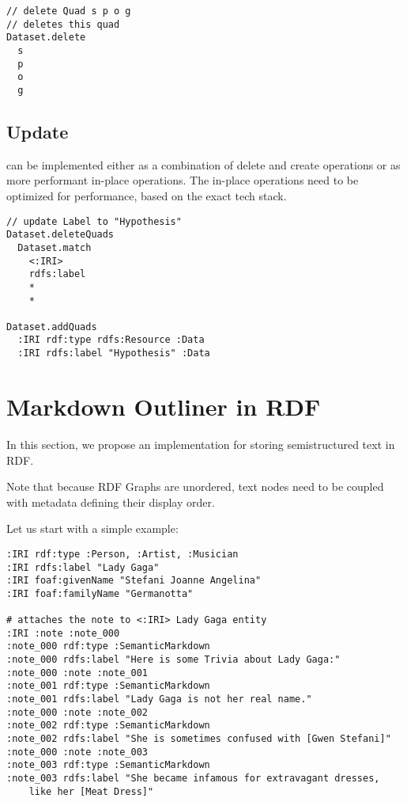 \begin{lstlisting}
// delete Quad s p o g
// deletes this quad
Dataset.delete
  s
  p
  o
  g

\end{lstlisting}

\subsection*{Update} 
can be implemented either as a combination of delete and create operations or as more performant in-place operations. The in-place operations need to be optimized for performance, based on the exact tech stack.

\begin{lstlisting}
// update Label to "Hypothesis"
Dataset.deleteQuads
  Dataset.match
    <:IRI> 
    rdfs:label 
    * 
    *

Dataset.addQuads
  :IRI rdf:type rdfs:Resource :Data
  :IRI rdfs:label "Hypothesis" :Data

\end{lstlisting}






\section{Markdown Outliner in RDF}

In this section, we propose an implementation for storing semistructured text in RDF.

Note that because RDF Graphs are unordered, text nodes need to be coupled with metadata defining their display order.

Let us start with a simple example:

\begin{verbatim}
:IRI rdf:type :Person, :Artist, :Musician
:IRI rdfs:label "Lady Gaga"
:IRI foaf:givenName "Stefani Joanne Angelina"
:IRI foaf:familyName "Germanotta"

# attaches the note to <:IRI> Lady Gaga entity
:IRI :note :note_000                
:note_000 rdf:type :SemanticMarkdown
:note_000 rdfs:label "Here is some Trivia about Lady Gaga:"
:note_000 :note :note_001
:note_001 rdf:type :SemanticMarkdown
:note_001 rdfs:label "Lady Gaga is not her real name."
:note_000 :note :note_002
:note_002 rdf:type :SemanticMarkdown
:note_002 rdfs:label "She is sometimes confused with [Gwen Stefani]"
:note_000 :note :note_003
:note_003 rdf:type :SemanticMarkdown
:note_003 rdfs:label "She became infamous for extravagant dresses, 
    like her [Meat Dress]"
\end{verbatim}


